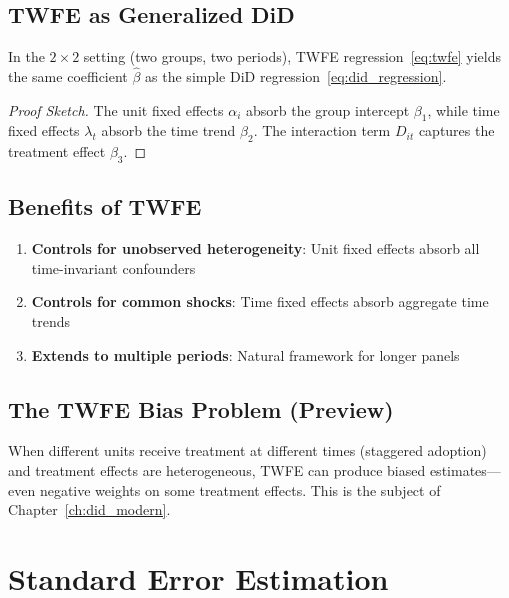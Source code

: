 \subsection{TWFE as Generalized DiD}

\begin{theorem}
In the $2 \times 2$ setting (two groups, two periods), TWFE regression~\eqref{eq:twfe} yields the same coefficient $\hat{\beta}$ as the simple DiD regression~\eqref{eq:did_regression}.
\end{theorem}

\begin{proof}[Proof Sketch]
The unit fixed effects $\alpha_i$ absorb the group intercept $\beta_1$, while time fixed effects $\lambda_t$ absorb the time trend $\beta_2$. The interaction term $D_{it}$ captures the treatment effect $\beta_3$.
\end{proof}

\subsection{Benefits of TWFE}

\begin{enumerate}
    \item \textbf{Controls for unobserved heterogeneity}: Unit fixed effects absorb all time-invariant confounders
    \item \textbf{Controls for common shocks}: Time fixed effects absorb aggregate time trends
    \item \textbf{Extends to multiple periods}: Natural framework for longer panels
\end{enumerate}

\subsection{The TWFE Bias Problem (Preview)}

\begin{remark}
When different units receive treatment at different times (staggered adoption) and treatment effects are heterogeneous, TWFE can produce biased estimates---even negative weights on some treatment effects. This is the subject of Chapter~\ref{ch:did_modern}.
\end{remark}

\section{Standard Error Estimation}
\label{sec:did_se}


